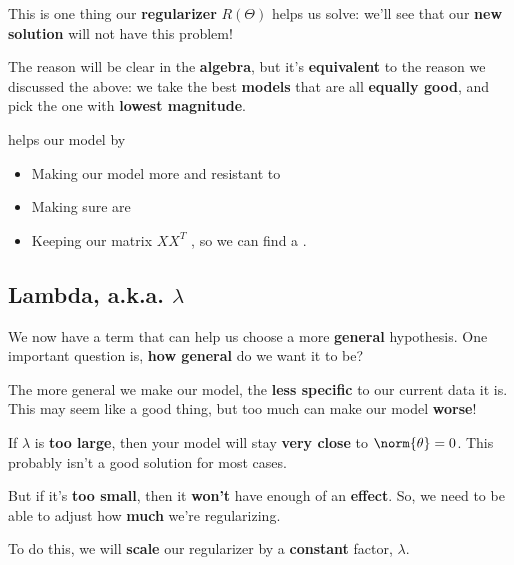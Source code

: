         This is one thing our \textbf{regularizer} $R(\Theta)$ helps us solve: we'll see that our \textbf{new solution} will not have this problem! 
        
        The reason will be clear in the \textbf{algebra}, but it's \textbf{equivalent} to the reason we discussed the above: we take the best \textbf{models} that are all \textbf{equally good}, and pick the one with \textbf{lowest magnitude}.\\
        
        \begin{concept}
             helps  our model by
            
            \begin{itemize}
                \item Making our model more  and resistant to 
                \item Making sure  are 
                \item Keeping our matrix $XX^T$ , so we can find a .
            \end{itemize}
        \end{concept}
        
    \subsection*{Lambda, a.k.a. $\lambda$}
    
        We now have a term that can help us choose a more \textbf{general} hypothesis. One important question is, \textbf{how general} do we want it to be?
        
        The more general we make our model, the \textbf{less specific} to our current data it is. This may seem like a good thing, but too much can make our model \textbf{worse}!
        
        If $\lambda$ is \textbf{too large}, then your model will stay \textbf{very close} to $\norm{\theta}=0$. This probably isn't a good solution for most cases.
        
        
        But if it's \textbf{too small}, then it \textbf{won't} have enough of an \textbf{effect}. So, we need to be able to adjust how \textbf{much} we're regularizing.
        
        To do this, we will \textbf{scale} our regularizer by a \textbf{constant} factor, $\lambda$.\\
        
